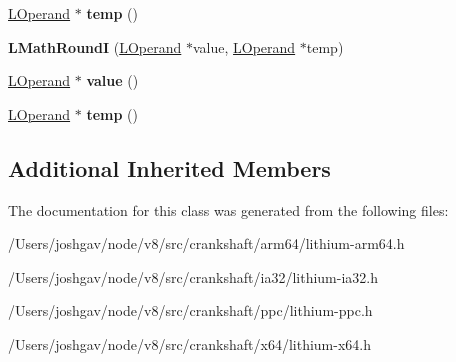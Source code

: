 \begin{DoxyCompactItemize}
\item 
\hyperlink{classv8_1_1internal_1_1_l_operand}{L\+Operand} $\ast$ {\bfseries temp} ()\hypertarget{classv8_1_1internal_1_1_l_math_round_i_a7318aaa832a554241f0f3686743cdeb3}{}\label{classv8_1_1internal_1_1_l_math_round_i_a7318aaa832a554241f0f3686743cdeb3}

\item 
{\bfseries L\+Math\+RoundI} (\hyperlink{classv8_1_1internal_1_1_l_operand}{L\+Operand} $\ast$value, \hyperlink{classv8_1_1internal_1_1_l_operand}{L\+Operand} $\ast$temp)\hypertarget{classv8_1_1internal_1_1_l_math_round_i_aac941cda19ca5bb7fa18f5388daa6ae2}{}\label{classv8_1_1internal_1_1_l_math_round_i_aac941cda19ca5bb7fa18f5388daa6ae2}

\item 
\hyperlink{classv8_1_1internal_1_1_l_operand}{L\+Operand} $\ast$ {\bfseries value} ()\hypertarget{classv8_1_1internal_1_1_l_math_round_i_a4d207d0f6d8e38b4aaacd84ce1bb4ea3}{}\label{classv8_1_1internal_1_1_l_math_round_i_a4d207d0f6d8e38b4aaacd84ce1bb4ea3}

\item 
\hyperlink{classv8_1_1internal_1_1_l_operand}{L\+Operand} $\ast$ {\bfseries temp} ()\hypertarget{classv8_1_1internal_1_1_l_math_round_i_a7318aaa832a554241f0f3686743cdeb3}{}\label{classv8_1_1internal_1_1_l_math_round_i_a7318aaa832a554241f0f3686743cdeb3}

\end{DoxyCompactItemize}
\subsection*{Additional Inherited Members}


The documentation for this class was generated from the following files\+:\begin{DoxyCompactItemize}
\item 
/\+Users/joshgav/node/v8/src/crankshaft/arm64/lithium-\/arm64.\+h\item 
/\+Users/joshgav/node/v8/src/crankshaft/ia32/lithium-\/ia32.\+h\item 
/\+Users/joshgav/node/v8/src/crankshaft/ppc/lithium-\/ppc.\+h\item 
/\+Users/joshgav/node/v8/src/crankshaft/x64/lithium-\/x64.\+h\end{DoxyCompactItemize}
